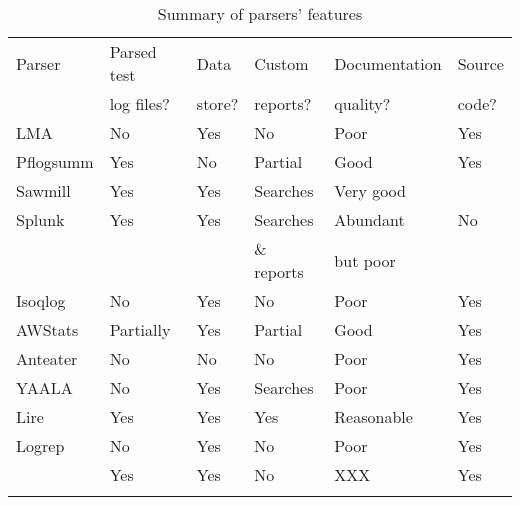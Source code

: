 \begin{table}[htb]
    \caption{Summary of parsers' features}
    \empty{}\label{Summary of parsers' features}
    \begin{tabular}{llllll}
        Parser          & Parsed test   & Data              & Custom            & Documentation  & Source       \\
                        & log files?    & store?            & reports?          & quality?       & code?        \\
        \tableline{}%
        \gls{LMA}       & No            & Yes               & No                & Poor           & Yes          \\ 
        Pflogsumm       & Yes           & No                & Partial \dag{}    & Good           & Yes          \\
        Sawmill         & Yes           & Yes               & Searches          & Very good      & \nialpha{}   \\
        Splunk          & Yes           & Yes               & Searches          & Abundant       & No           \\
                        &               &                   & \& reports        & but poor       &              \\
        Isoqlog         & No            & Yes               & No                & Poor           & Yes          \\
        AWStats         & Partially     & Yes               & Partial \dag{}    & Good           & Yes          \\
        Anteater        & No            & No                & No                & Poor           & Yes          \\
        YAALA           & No            & Yes \ddag{}       & Searches          & Poor           & Yes          \\
        Lire            & Yes           & Yes               & Yes               & Reasonable     & Yes          \\
        Logrep          & No            & Yes               & No                & Poor           & Yes          \\
        \parsername{}   & Yes           & Yes \nibeta{}     & No \nichi{}       & XXX            & Yes          \\
        \tableline{}
    \end{tabular}

    \begin{eqlist}


\end{eqlist}
\end{table}
